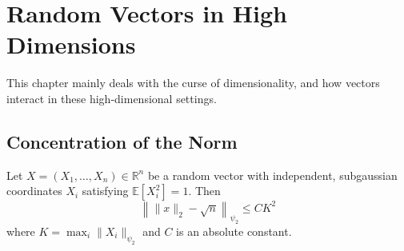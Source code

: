 \section{Random Vectors in High Dimensions}
This chapter mainly deals with the curse of dimensionality, and how vectors interact in these 
high-dimensional settings.



\subsection{Concentration of the Norm}
\begin{theorem}
\label{thm:3.1.1}
Let $X = (X_1, \dots, X_n) \in \mathbb{R}^n$ be a random vector with independent, subgaussian coordinates 
$X_i$ satisfying $\mathbb{E}[X_i^2] = 1$. Then 
\[ \left\lVert \lVert x \rVert_2 - \sqrt{n} \right\rVert_{\psi_2} \leq CK^2 \]
where $K = \max_{i} \lVert X_i \rVert_{\psi_2}$ and $C$ is an absolute constant.
\end{theorem}

